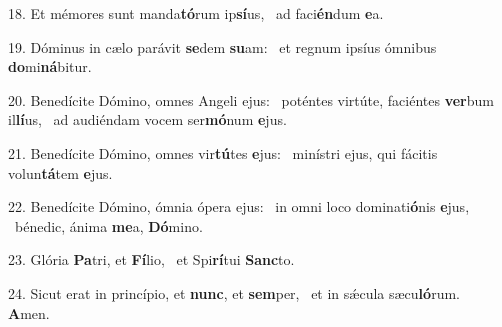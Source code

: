 18. Et mémores sunt manda\textbf{tó}rum ip\textbf{sí}us, \ast\  ad faci\textbf{én}dum \textbf{e}a.\

19. Dóminus in cælo parávit \textbf{se}dem \textbf{su}am: \ast\  et regnum ipsíus ómnibus \textbf{do}mi\textbf{ná}bitur.\

20. Benedícite Dómino, omnes Angeli ejus: \dag\  poténtes virtúte, faciéntes \textbf{ver}bum il\textbf{lí}us, \ast\  ad audiéndam vocem ser\textbf{mó}num \textbf{e}jus.\

21. Benedícite Dómino, omnes vir\textbf{tú}tes \textbf{e}jus: \ast\  minístri ejus, qui fácitis volun\textbf{tá}tem \textbf{e}jus.\

22. Benedícite Dómino, ómnia ópera ejus: \dag\  in omni loco dominati\textbf{ó}nis \textbf{e}jus, \ast\  bénedic, ánima \textbf{me}a, \textbf{Dó}mino.\

23. Glória \textbf{Pa}tri, et \textbf{Fí}lio, \ast\  et Spi\textbf{rí}tui \textbf{Sanc}to.\

24. Sicut erat in princípio, et \textbf{nunc}, et \textbf{sem}per, \ast\  et in sǽcula sæcu\textbf{ló}rum. \textbf{A}men.\

